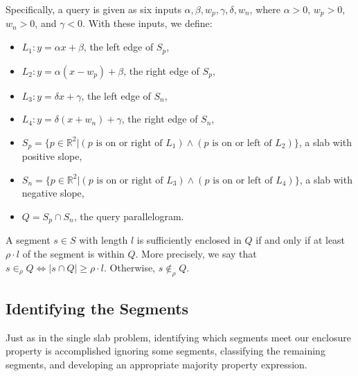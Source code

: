 Specifically, a query is given as six inputs $\alpha, \beta, w_p, \gamma, \delta, w_n$, where $\alpha > 0$, $w_p > 0$, $w_n > 0$, and $\gamma < 0$. With these inputs, we define:

\begin{itemize}
 \item $L_1 : y = \alpha x + \beta$, the left edge of $S_p$,

 \item $L_2 : y = \alpha (x - w_p) + \beta$, the right edge of $S_p$,

 \item $L_3 : y = \delta x + \gamma$, the left edge of $S_n$,

 \item $L_4 : y = \delta (x + w_n) + \gamma$, the right edge of $S_n$,

 \item $S_p = \{ p \in \mathbb{R}^2 | (p \text{ is on or right of } L_1) \wedge (p \text{ is on or left of } L_2) \}$, a slab with positive slope,

 \item $S_n = \{ p \in \mathbb{R}^2 | (p \text{ is on or right of } L_3) \wedge (p \text{ is on or left of } L_4) \}$, a slab with negative slope,

 \item $Q = S_p \cap S_n$, the query parallelogram.

\end{itemize}

A segment $s \in S$ with length $l$ is sufficiently enclosed in $Q$ if and only if at least $\rho \cdot l$ of the segment is within $Q$. More precisely, we say that $s \in_\rho Q \Leftrightarrow |s \cap Q| \geq \rho \cdot l$. Otherwise, $s \not \in_\rho Q$.


\subsection{Identifying the Segments}
\label{:slabs:two:approach}

Just as in the single slab problem, identifying which segments meet our enclosure property is accomplished ignoring some segments, classifying the remaining segments, and developing an appropriate majority property expression.

